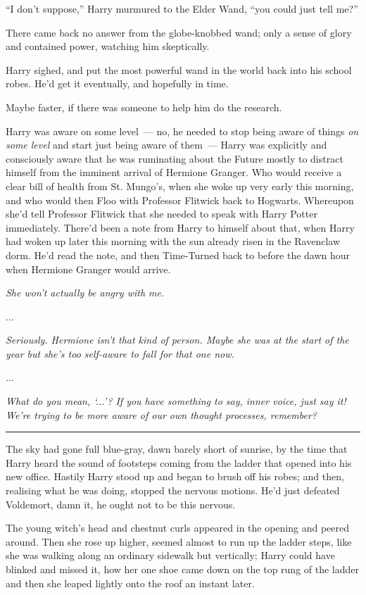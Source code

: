 ``I don't suppose,'' Harry murmured to the Elder Wand, ``you could just tell me?''

There came back no answer from the globe-knobbed wand; only a sense of glory and contained power, watching him skeptically.

Harry sighed, and put the most powerful wand in the world back into his school robes. He'd get it eventually, and hopefully in time.

Maybe faster, if there was someone to help him do the research.

Harry was aware on some level~--- no, he needed to stop being aware of things \emph{on some level} and start just being aware of them~--- Harry was explicitly and consciously aware that he was ruminating about the Future mostly to distract himself from the imminent arrival of Hermione Granger. Who would receive a clear bill of health from St. Mungo's, when she woke up very early this morning, and who would then Floo with Professor Flitwick back to Hogwarts. Whereupon she'd tell Professor Flitwick that she needed to speak with Harry Potter immediately. There'd been a note from Harry to himself about that, when Harry had woken up later this morning with the sun already risen in the Ravenclaw dorm. He'd read the note, and then Time-Turned back to before the dawn hour when Hermione Granger would arrive.

\emph{She won't actually be angry with me.}

...

\emph{Seriously. Hermione isn't that kind of person. Maybe she was at the start of the year but she's too self-aware to fall for that one now.}

...

\emph{What do you mean, `...'? If you have something to say, inner voice, just say it! We're trying to be more aware of our own thought processes, remember?}

\begin{center}\rule{3in}{0.4pt}\end{center}

The sky had gone full blue-gray, dawn barely short of sunrise, by the time that Harry heard the sound of footsteps coming from the ladder that opened into his new office. Hastily Harry stood up and began to brush off his robes; and then, realising what he was doing, stopped the nervous motions. He'd just defeated Voldemort, damn it, he ought not to be this nervous.

The young witch's head and chestnut curls appeared in the opening and peered around. Then she rose up higher, seemed almost to run up the ladder steps, like she was walking along an ordinary sidewalk but vertically; Harry could have blinked and missed it, how her one shoe came down on the top rung of the ladder and then she leaped lightly onto the roof an instant later.

